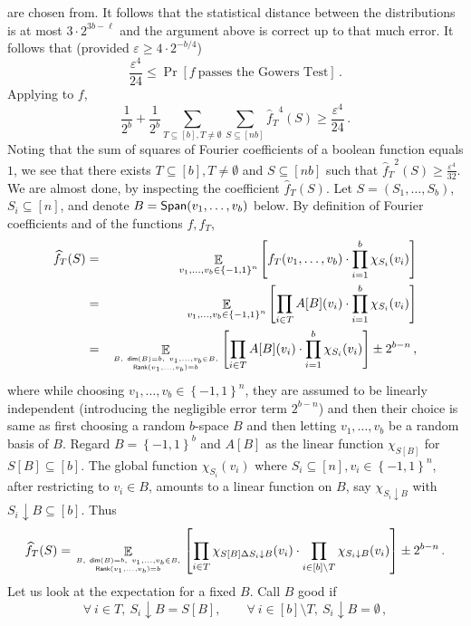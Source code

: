 \documentclass{toc}
\newcommand\set[1]{{\left\{ #1 \right\}}}
\newcommand\Prob[2]{{\Pr_{#1}\left[ {#2} \right]}}
\newcommand\Expect[2]{{\mathop{\mathbb{E}}_{#1}\left[ {#2} \right]}}
\newcommand\cube[1]{ { \set{-1,1}^{#1} } }
\newcommand\eps{\varepsilon}
\renewcommand\geq{\geqslant}
\renewcommand\leq{\leqslant}
\begin{document}
are chosen from. It follows that the statistical distance between the distributions is at most $3\cdot 2^{3b-\ell}$ and the argument
above is correct up to that much error. It follows that (provided $\eps \geq 4\cdot 2^{-b/4}$)
 $$  \frac{\eps^4}{24} \leq \Prob{}{f ~\mbox{passes the Gowers Test}}\,. $$%
Applying  to $f$,
 $$ \frac{1}{2^b} + \frac{1}{2^b} \sum\limits_{T\subseteq [b], T \neq \emptyset}{\sum\limits_{S \subseteq [nb]}{{\widehat{f}_T}^4(S)}}
 \geq  \frac{\eps^4}{24}\,. $$%
Noting that the sum of squares of Fourier coefficients of a boolean function equals $1$, we see that there exists $T \subseteq [b],
T \neq \emptyset$ and $S \subseteq [nb]$ such that
${\widehat{f}_T}^2(S)  \geq \frac{\eps^4}{32}$. We are almost done, by inspecting the coefficient  $\widehat{f}_T(S)$. Let $S = (S_1,\ldots, S_b)$,
$S_i \subseteq [n]$, and  denote $B = {\sf Span}(v_1,\ldots,v_b)$  below.
 By definition of Fourier coefficients and of the functions $f, f_T$,
\begin{eqnarray*}
   \widehat{f}_T(S) & = & \Expect{v_1,\ldots,v_b \in \cube{n}}{ f_T(v_1,\ldots,v_b) \cdot \prod_{i=1}^b \chi_{S_i}(v_i) } \\
    & = &  \Expect{v_1,\ldots,v_b \in \cube{n}}{ \prod_{i\in T} A[B](v_i)  \cdot \prod_{i=1}^b \chi_{S_i}(v_i) } \\
    & = & \Expect{B, ~{\sf dim}(B)=b, ~v_1,\ldots, v_b \in B,  \atop{{\sf Rank}(v_1,\ldots,v_b)=b}  }{ \prod_{i\in T} A[B](v_i)  \cdot \prod_{i=1}^b \chi_{S_i}(v_i)}
     \pm 2^{b-n}\,,%
\end{eqnarray*}
where while choosing $v_1,\ldots,v_b \in \cube{n}$, they are assumed to be linearly independent (introducing the negligible error term $2^{b-n}$) and then
their choice is same as first choosing a random $b$-space $B$ and then letting  $v_1,\ldots,v_b$ be a random basis of $B$. Regard $B = \cube{b}$ and $A[B]$ as
the linear function $\chi_{S[B]}$ for $S[B] \subseteq [b]$. The global function $\chi_{S_i} (v_i)$ where $S_i \subseteq [n], v_i \in \cube{n}$, after restricting
to $v_i \in B$, amounts to a linear function on $B$, say $\chi_{S_i \downarrow B}$ with  $S_i \downarrow B \subseteq [b]$. Thus
$$
   \widehat{f}_T(S)  =  \Expect{B, ~{\sf dim}(B)=b, ~v_1,\ldots, v_b \in B,  \atop{{\sf Rank}(v_1,\ldots,v_b)=b}  }
                                 { \prod_{i\in T}  \chi_{S[B] \Delta S_i\downarrow B} (v_i)   \cdot \prod_{i\in [b]\setminus T}  \chi_{S_i\downarrow B}(v_i)}
     \pm 2^{b-n}\,.%
$$
Let us look at the expectation for a fixed $B$. Call $B$ good if
\begin{equation}  \label{eqn:good-B}
 \forall  ~i\in T,  \  S_i\downarrow B = S[B], \quad \quad \forall ~i\in [b]\setminus T, \  S_i\downarrow B=\emptyset\,,%
\end{equation}
\end{document}
